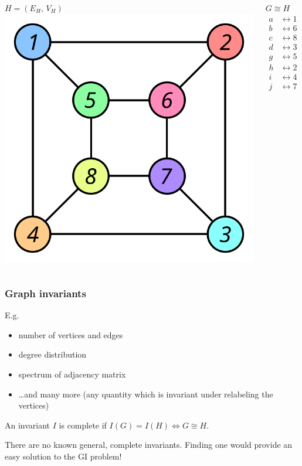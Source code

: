 \documentclass[handout]{beamer}
\begin{document}
\begin{frame}[t]
\begin{columns}[T]
    \centering
    $H=(E_H,\,V_H)$ \\[4ex]
    \includegraphics[scale=0.36]{Graph_isomorphism_b}

    \centering
    \alert<1|handout:1>{$G \cong H$}
     {%
      \begin{align*}
        a &\leftrightarrow 1 \\
        b &\leftrightarrow 6 \\
        c &\leftrightarrow 8 \\
        d &\leftrightarrow 3 \\
        g &\leftrightarrow 5 \\
        h &\leftrightarrow 2 \\
        i &\leftrightarrow 4 \\
        j &\leftrightarrow 7
      \end{align*}
    }
  \end{columns}
\end{frame}
\begin{frame}
  \frametitle{Graph invariants}
  E.g.
  \begin{itemize}
    \item number of vertices and edges
    \item degree distribution
    \item spectrum of adjacency matrix
    \item \ldots and many more (any quantity which is invariant under
      relabeling the vertices)
  \end{itemize}
  \begin{definition}
    An invariant $I$ is \alert{complete} if $I(G) = I(H) \iff G \cong H$.
  \end{definition}
  There are no known general, complete invariants. Finding one would provide an
  easy solution to the GI problem!
\end{frame}
\end{document}
